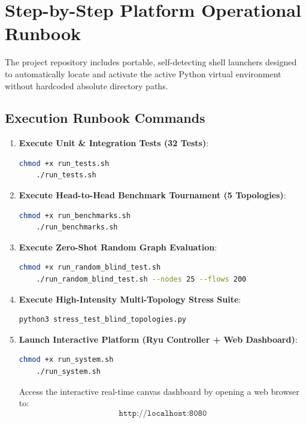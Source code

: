 \documentclass[12pt,a4paper,oneside]{report}
\begin{document}
\section{Step-by-Step Platform Operational Runbook}
The project repository includes portable, self-detecting shell launchers designed to automatically locate and activate the active Python virtual environment without hardcoded absolute directory paths.

\subsection{Execution Runbook Commands}
\begin{enumerate}
    \item \textbf{Execute Unit \& Integration Tests (32 Tests)}:
    \begin{lstlisting}[language=bash]
    chmod +x run_tests.sh
    ./run_tests.sh
    \end{lstlisting}
    
    \item \textbf{Execute Head-to-Head Benchmark Tournament (5 Topologies)}:
    \begin{lstlisting}[language=bash]
    chmod +x run_benchmarks.sh
    ./run_benchmarks.sh
    \end{lstlisting}
    
    \item \textbf{Execute Zero-Shot Random Graph Evaluation}:
    \begin{lstlisting}[language=bash]
    chmod +x run_random_blind_test.sh
    ./run_random_blind_test.sh --nodes 25 --flows 200
    \end{lstlisting}
    
    \item \textbf{Execute High-Intensity Multi-Topology Stress Suite}:
    \begin{lstlisting}[language=bash]
    python3 stress_test_blind_topologies.py
    \end{lstlisting}
    
    \item \textbf{Launch Interactive Platform (Ryu Controller + Web Dashboard)}:
    \begin{lstlisting}[language=bash]
    chmod +x run_system.sh
    ./run_system.sh
    \end{lstlisting}
    Access the interactive real-time canvas dashboard by opening a web browser to:
    \begin{equation*}
        \texttt{http://localhost:8080}
    \end{equation*}
    

\end{enumerate}
\end{document}
